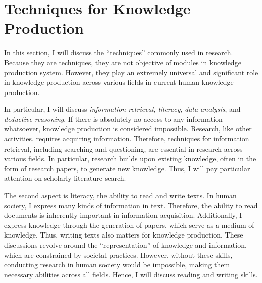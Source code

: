 \documentclass{book}
\begin{document}



\section{Techniques for Knowledge Production}

In this section, I will discuss the ``techniques'' commonly used in research. Because they are techniques, they are not objective of modules in knowledge production system. However, they play an extremely universal and significant role in knowledge production across various fields in current human knowledge production. 

In particular, I will discuss \textit{information retrieval}, \textit{literacy}, \textit{data analysis}, and \textit{deductive reasoning}. If there is absolutely no access to any information whatsoever, knowledge production is considered impossible. Research, like other activities, requires acquiring information. Therefore, techniques for information retrieval, including searching and questioning, are essential in research across various fields. In particular, research builds upon existing knowledge, often in the form of research papers, to generate new knowledge. Thus, I will pay particular attention on scholarly literature search. 

The second aspect is literacy, the ability to read and write texts. In human society, I express many kinds of information in text. Therefore, the ability to read documents is inherently important in information acquisition. Additionally, I express knowledge through the generation of papers, which serve as a medium of knowledge. Thus, writing texts also matters for knowledge production. These discussions revolve around the ``representation'' of knowledge and information, which are constrained by societal practices. However, without these skills, conducting research in human society would be impossible, making them necessary abilities across all fields. Hence, I will discuss reading and writing skills. 
\end{document}
